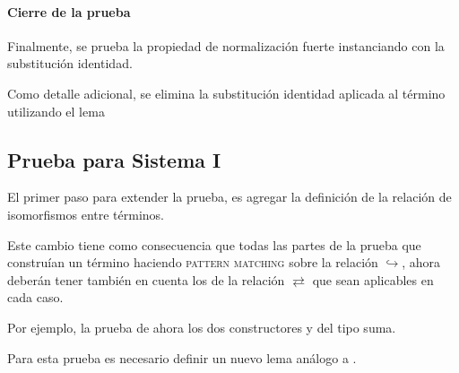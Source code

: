 

\begin{samepage}
\end{samepage}


\paragraph{Cierre de la prueba}

Finalmente, se prueba la propiedad de normalización fuerte instanciando  con la substitución identidad.

Como detalle adicional, se elimina la substitución identidad aplicada al término utilizando el lema
\AgdaSymbol{:}
\AgdaSymbol{\}}
\AgdaSymbol{\{}
\AgdaSymbol{:}
\AgdaSymbol{\}}



\subsection{Prueba para Sistema I}

El primer paso para extender la prueba, es agregar la definición de  la relación de isomorfismos entre términos.


Este cambio tiene como consecuencia que todas las partes de la prueba que construían un término \snstar haciendo \textsc{pattern matching} sobre la relación $\hookrightarrow$, ahora deberán tener también en cuenta los de la relación $\rightleftarrows$ que sean aplicables en cada caso.

Por ejemplo, la prueba de  ahora los dos constructores  y  del tipo suma.


Para esta prueba es necesario definir un nuevo lema análogo a .


